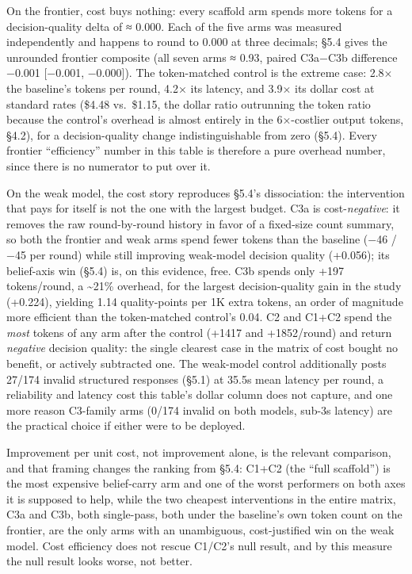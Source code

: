 \documentclass[
  11pt,
]{article}
\begin{document}
On the frontier, cost buys nothing: every scaffold arm spends more tokens for a decision-quality delta of ≈ 0.000. Each of the five arms was measured independently and happens to round to 0.000 at three decimals; §5.4 gives the unrounded frontier composite (all seven arms ≈ 0.93, paired C3a−C3b difference −0.001 {[}−0.001, −0.000{]}). The token-matched control is the extreme case: 2.8× the baseline's tokens per round, 4.2× its latency, and 3.9× its dollar cost at standard rates (\$4.48 vs.~\$1.15, the dollar ratio outrunning the token ratio because the control's overhead is almost entirely in the 6×-costlier output tokens, §4.2), for a decision-quality change indistinguishable from zero (§5.4). Every frontier ``efficiency'' number in this table is therefore a pure overhead number, since there is no numerator to put over it.

On the weak model, the cost story reproduces §5.4's dissociation: the intervention that pays for itself is not the one with the largest budget. C3a is cost-\emph{negative}: it removes the raw round-by-round history in favor of a fixed-size count summary, so both the frontier and weak arms spend fewer tokens than the baseline (−46 / −45 per round) while still improving weak-model decision quality (+0.056); its belief-axis win (§5.4) is, on this evidence, free. C3b spends only +197 tokens/round, a \textasciitilde21\% overhead, for the largest decision-quality gain in the study (+0.224), yielding 1.14 quality-points per 1K extra tokens, an order of magnitude more efficient than the token-matched control's 0.04. C2 and C1+C2 spend the \emph{most} tokens of any arm after the control (+1417 and +1852/round) and return \emph{negative} decision quality: the single clearest case in the matrix of cost bought no benefit, or actively subtracted one. The weak-model control additionally posts 27/174 invalid structured responses (§5.1) at 35.5s mean latency per round, a reliability and latency cost this table's dollar column does not capture, and one more reason C3-family arms (0/174 invalid on both models, sub-3s latency) are the practical choice if either were to be deployed.

Improvement per unit cost, not improvement alone, is the relevant comparison, and that framing changes the ranking from §5.4: C1+C2 (the ``full scaffold'') is the most expensive belief-carry arm and one of the worst performers on both axes it is supposed to help, while the two cheapest interventions in the entire matrix, C3a and C3b, both single-pass, both under the baseline's own token count on the frontier, are the only arms with an unambiguous, cost-justified win on the weak model. Cost efficiency does not rescue C1/C2's null result, and by this measure the null result looks worse, not better.
\end{document}
